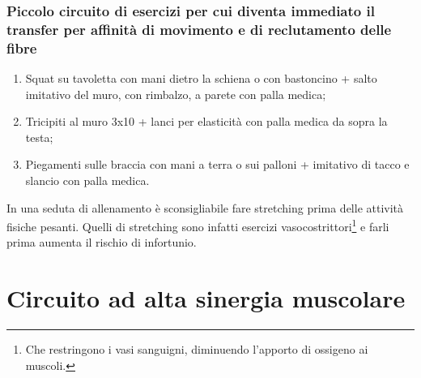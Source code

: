 \subsubsection{
Piccolo circuito di esercizi per cui diventa immediato il transfer per affinità di movimento e di reclutamento delle fibre}
\begin{enumerate}
\item Squat su tavoletta con mani dietro la schiena o con bastoncino + salto imitativo del muro, con
rimbalzo, a parete con palla medica;
\item Tricipiti al muro 3x10 + lanci per elasticità con palla medica da sopra la testa;
\item Piegamenti sulle braccia con mani a terra o sui palloni + imitativo di tacco e slancio con palla
medica.
\end{enumerate}

\begin{ross}
In una seduta di allenamento è sconsigliabile fare stretching prima delle
attività
fisiche pesanti. Quelli di stretching sono infatti esercizi
vasocostrittori\footnote{Che restringono i vasi sanguigni, diminuendo l'apporto
di ossigeno ai muscoli.} e farli prima aumenta il rischio di infortunio.
\end{ross}

\section{Circuito ad alta sinergia muscolare}
